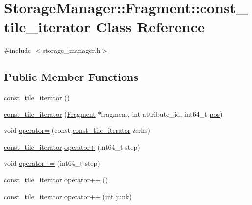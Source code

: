 \hypertarget{classStorageManager_1_1Fragment_1_1const__tile__iterator}{}\section{Storage\+Manager\+:\+:Fragment\+:\+:const\+\_\+tile\+\_\+iterator Class Reference}
\label{classStorageManager_1_1Fragment_1_1const__tile__iterator}


{\ttfamily \#include $<$storage\+\_\+manager.\+h$>$}

\subsection*{Public Member Functions}
\begin{DoxyCompactItemize}
\item 
\hyperlink{classStorageManager_1_1Fragment_1_1const__tile__iterator_ab113d3e34db7f22db7358c0178bf4f50}{const\+\_\+tile\+\_\+iterator} ()
\item 
\hyperlink{classStorageManager_1_1Fragment_1_1const__tile__iterator_a285e53d50a87c2f063305dad02518181}{const\+\_\+tile\+\_\+iterator} (\hyperlink{classStorageManager_1_1Fragment}{Fragment} $\ast$fragment, int attribute\+\_\+id, int64\+\_\+t \hyperlink{classStorageManager_1_1Fragment_1_1const__tile__iterator_ac04a30e821b2046970f3ed6b6f5154be}{pos})
\item 
void \hyperlink{classStorageManager_1_1Fragment_1_1const__tile__iterator_aae85a6da26c3d69c577539aedc965529}{operator=} (const \hyperlink{classStorageManager_1_1Fragment_1_1const__tile__iterator}{const\+\_\+tile\+\_\+iterator} \&rhs)
\item 
\hyperlink{classStorageManager_1_1Fragment_1_1const__tile__iterator}{const\+\_\+tile\+\_\+iterator} \hyperlink{classStorageManager_1_1Fragment_1_1const__tile__iterator_a77f13fc913b1cd015e9bf61201d1d791}{operator+} (int64\+\_\+t step)
\item 
void \hyperlink{classStorageManager_1_1Fragment_1_1const__tile__iterator_a85cd6195209f517f5093d974e1335f2b}{operator+=} (int64\+\_\+t step)
\item 
\hyperlink{classStorageManager_1_1Fragment_1_1const__tile__iterator}{const\+\_\+tile\+\_\+iterator} \hyperlink{classStorageManager_1_1Fragment_1_1const__tile__iterator_ad4f3f5951a0675eb39ed184929e5f5ca}{operator++} ()
\item 
\hyperlink{classStorageManager_1_1Fragment_1_1const__tile__iterator}{const\+\_\+tile\+\_\+iterator} \hyperlink{classStorageManager_1_1Fragment_1_1const__tile__iterator_a47ec35646605b6141a310b0ee6b80f90}{operator++} (int junk)

\end{DoxyCompactItemize}
